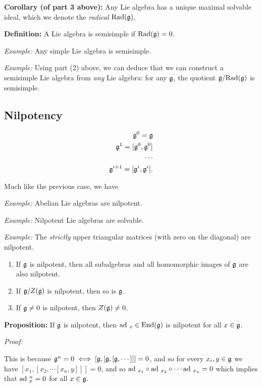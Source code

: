 \textbf{Corollary (of part 3 above):} Any Lie algebra has a unique
maximal solvable ideal, which we denote the \emph{radical}
\(\mathrm{Rad}({\mathfrak{g}})\).

\textbf{Definition:} A Lie algebra is semisimple if
\(\mathrm{Rad}({\mathfrak{g}}) = 0\).

\emph{Example:} Any simple Lie algebra is semisimple.

\emph{Example:} Using part (2) above, we can deduce that we can
construct a semisimple Lie algebra from \emph{any} Lie algebra: for any
\({\mathfrak{g}}\), the quotient \({\mathfrak{g}}/\mathrm{Rad}({\mathfrak{g}})\) is semisimple.

\hypertarget{nilpotency}{%
\subsection{Nilpotency}\label{nilpotency}}

\begin{align*}
{\mathfrak{g}}^{0} = {\mathfrak{g}} \\
{\mathfrak{g}}^{1} = [{\mathfrak{g}}^{0}, {\mathfrak{g}}^{0}] \\
\cdots \\
{\mathfrak{g}}^{i+1} = [{\mathfrak{g}}^{i}, {\mathfrak{g}}^{i}]
.\end{align*}

Much like the previous case, we have

\emph{Example:} Abelian Lie algebras are nilpotent.

\emph{Example:} Nilpotent Lie algebras are solvable.

\emph{Example:} The \emph{strictly} upper triangular matrices (with zero
on the diagonal) are nilpotent.

\begin{enumerate}
\def\labelenumi{\arabic{enumi}.}
\tightlist
\item
  If \({\mathfrak{g}}\) is nilpotent, then all subalgebras and all homomorphic
  images of \({\mathfrak{g}}\) are also nilpotent.
\item
  If \({\mathfrak{g}}/Z({\mathfrak{g}})\) is nilpotent, then so is \({\mathfrak{g}}\).
\item
  If \({\mathfrak{g}} \neq 0\) is nilpotent, then \(Z({\mathfrak{g}}) \neq 0\).
\end{enumerate}

\textbf{Proposition:} If \({\mathfrak{g}}\) is nilpotent, then
\(\mathrm{ad}~_x \in \mathrm{End}({\mathfrak{g}})\) is nilpotent for all \(x\in {\mathfrak{g}}\).

\emph{Proof:}

This is because
\({\mathfrak{g}}^n = 0 \iff [{\mathfrak{g}}, [{\mathfrak{g}}, [{\mathfrak{g}}, \cdots]]] = 0\), and so for
every \(x_i, y \in {\mathfrak{g}}\) we have
\([x_1, [x_2, \cdots [x_n, y]]] = 0\), and so
\(\mathrm{ad}~_{x_1} \circ \mathrm{ad}~_{x_2} \circ \cdots \mathrm{ad}~_{x_n} = 0\) which implies
that \(\mathrm{ad}~_x^n = 0\) for all \(x\in {\mathfrak{g}}\).

